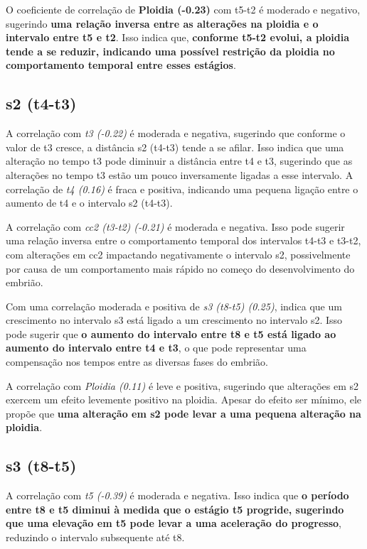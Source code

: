 O coeficiente de correlação de \textbf{Ploidia (-0.23)} com t5-t2 é moderado e negativo, sugerindo \textbf{uma relação inversa entre as alterações na ploidia e o intervalo entre t5 e t2}. Isso indica que, \textbf{conforme t5-t2 evolui, a ploidia tende a se reduzir, indicando uma possível restrição da ploidia no comportamento temporal entre esses estágios}. 

\subsection*{s2 (t4-t3)}
A correlação com \textit{t3 (-0.22)} é moderada e negativa, sugerindo que conforme o valor de t3 cresce, a distância s2 (t4-t3) tende a se afilar. Isso indica que uma alteração no tempo t3 pode diminuir a distância entre t4 e t3, sugerindo que as alterações no tempo t3 estão um pouco inversamente ligadas a esse intervalo. A correlação de \textit{t4 (0.16)} é fraca e positiva, indicando uma pequena ligação entre o aumento de t4 e o intervalo s2 (t4-t3). 

A correlação com \textit{cc2 (t3-t2) (-0.21)} é moderada e negativa. Isso pode sugerir uma relação inversa entre o comportamento temporal dos intervalos t4-t3 e t3-t2, com alterações em cc2 impactando negativamente o intervalo s2, possivelmente por causa de um comportamento mais rápido no começo do desenvolvimento do embrião.

Com uma correlação moderada e positiva de \textit{s3 (t8-t5) (0.25)}, indica que um crescimento no intervalo s3 está ligado a um crescimento no intervalo s2. Isso pode sugerir que \textbf{o aumento do intervalo entre t8 e t5 está ligado ao aumento do intervalo entre t4 e t3}, o que pode representar uma compensação nos tempos entre as diversas fases do embrião.

A correlação com \textit{Ploidia (0.11)} é leve e positiva, sugerindo que alterações em s2 exercem um efeito levemente positivo na ploidia. Apesar do efeito ser mínimo, ele propõe que \textbf{uma alteração em s2 pode levar a uma pequena alteração na ploidia}.

\subsection*{s3 (t8-t5)}
A correlação com \textit{t5 (-0.39)} é moderada e negativa. Isso indica que \textbf{o período entre t8 e t5 diminui à medida que o estágio t5 progride, sugerindo que uma elevação em t5 pode levar a uma aceleração do progresso}, reduzindo o intervalo subsequente até t8. 

